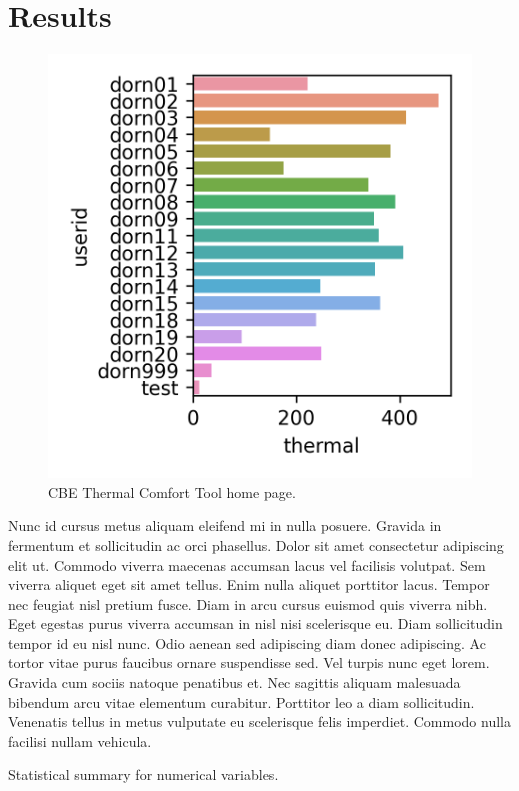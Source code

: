 \section{Results}
\begin{figure}[]
    \centering
    \includegraphics{figures/project/1.png}
    \caption{CBE Thermal Comfort Tool home page.}
    \label{fig:cbe_ashrae}
\end{figure}

Nunc id cursus metus aliquam eleifend mi in nulla posuere. Gravida in fermentum et sollicitudin ac orci phasellus. Dolor sit amet consectetur adipiscing elit ut. Commodo viverra maecenas accumsan lacus vel facilisis volutpat. Sem viverra aliquet eget sit amet tellus. Enim nulla aliquet porttitor lacus. Tempor nec feugiat nisl pretium fusce. Diam in arcu cursus euismod quis viverra nibh. Eget egestas purus viverra accumsan in nisl nisi scelerisque eu. Diam sollicitudin tempor id eu nisl nunc. Odio aenean sed adipiscing diam donec adipiscing. Ac tortor vitae purus faucibus ornare suspendisse sed. Vel turpis nunc eget lorem. Gravida cum sociis natoque penatibus et. Nec sagittis aliquam malesuada bibendum arcu vitae elementum curabitur. Porttitor leo a diam sollicitudin. Venenatis tellus in metus vulputate eu scelerisque felis imperdiet. Commodo nulla facilisi nullam vehicula.

\begin{center}

	\begin{table}[!t]
	\caption{Statistical summary for numerical variables.
	{\label{tab:stats_num_data}}}
	
	\end{table}
\end{center}